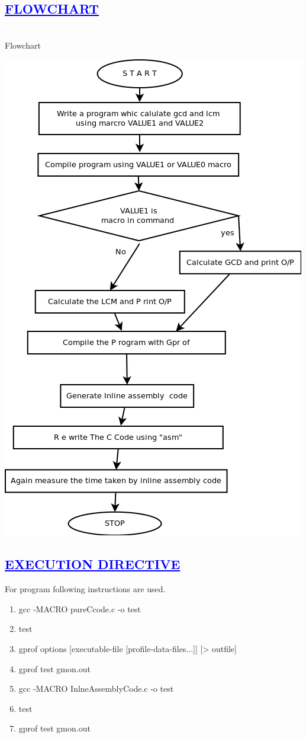 \documentclass[a4paper,12pt]{report}
\begin{document}
\begin{center}
\chapter{\textcolor{blue}{\underline {FLOWCHART}}}
\end{center}
\noindent \\Flowchart
\begin{center}
 \includegraphics[width=13 cm,height=12 cm]{./flowchart.png}
\end{center}


\begin{center}
\chapter{\textcolor{blue}{\underline {EXECUTION DIRECTIVE}}}
\end{center}

 For program following instructions are used.
 \begin{enumerate}
  \item gcc -MACRO pureCcode.c -o test
  \item test
  \item gprof options [executable-file [profile-data-files...]] [> outfile]
\item gprof test gmon.out 
   \item gcc -MACRO InlneAssemblyCode.c -o test
  \item test
 
\item gprof test gmon.out  
 \end{enumerate}
\end{document}
